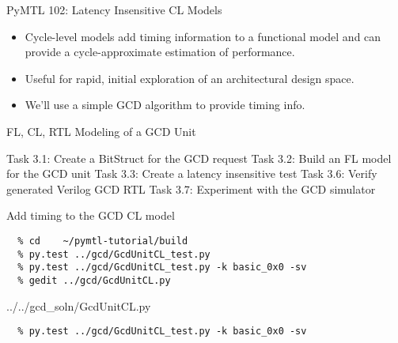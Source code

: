 \begin{frame}{PyMTL 102: Latency Insensitive CL Models}

\begin{itemize}
  \item Cycle-level models add timing information to a functional model
        and can provide a cycle-approximate estimation of performance.
  \smallskip
  \item Useful for rapid, initial exploration of an
        architectural design space.
  \smallskip
  \item We'll use a simple GCD algorithm to provide timing info.
\end{itemize}

\end{frame}


\begin{frame}{ FL, CL, RTL Modeling of a GCD Unit}
\begin{cbxlist}
  \1 Task 3.1: Create a BitStruct for the GCD request
  \1 Task 3.2: Build an FL model for the GCD unit
  \1 Task 3.3: Create a latency insensitive test
  \1 
  \1 
  \1 Task 3.6: Verify generated Verilog GCD RTL
  \1 Task 3.7: Experiment with the GCD simulator
\end{cbxlist}
\end{frame}

\begin{task}\begin{frame}[fragile]{Add timing to the GCD CL model}
\vspace{-0.25in}
\begin{verbatim}
  % cd    ~/pymtl-tutorial/build
  % py.test ../gcd/GcdUnitCL_test.py
  % py.test ../gcd/GcdUnitCL_test.py -k basic_0x0 -sv
  % gedit ../gcd/GcdUnitCL.py
\end{verbatim}

\vspace{-0.1in}
%
{../../gcd_soln/GcdUnitCL.py}

\begin{verbatim}
  % py.test ../gcd/GcdUnitCL_test.py -k basic_0x0 -sv
\end{verbatim}
\end{frame}
\end{task}

